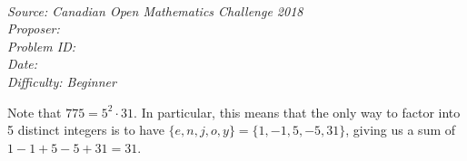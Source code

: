 \SSbreak\\
\emph{Source: Canadian Open Mathematics Challenge 2018}\\
\emph{Proposer: \Pnjoy}\\ %
\emph{Problem ID:}\\
\emph{Date: }\\
\emph{Difficulty: Beginner}\\
\SSbreak

\bigskip

\begin{solution}\hfil\medskip
	
	Note that \(775 = 5^2 \cdot 31\). In particular, this means that the only way to factor into 5 distinct integers is to have \( \{e, n, j, o, y\} = \{1, -1, 5, -5, 31\} \), giving us a sum of \(1 - 1 + 5 - 5 + 31 = \boxed{31}\). 
\end{solution}\bigskip

